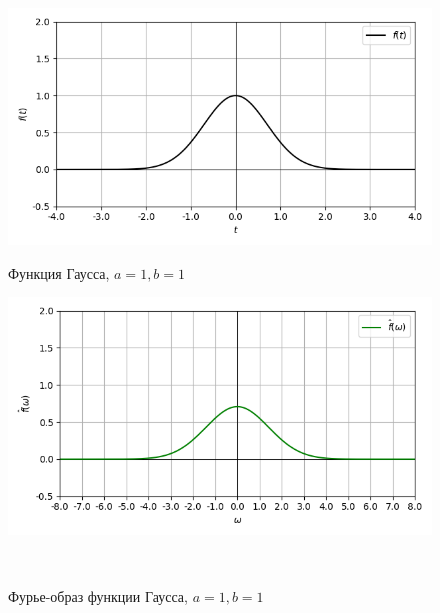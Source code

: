 \documentclass[a4paper]{article}
\begin{document}
\begin{figure}[H]
    \begin{minipage}{0.5\textwidth}
        \centering \includegraphics[width=\textwidth]{gaussian/real_graph_1_1.png}
        \caption{Функция Гаусса, $a = 1, b = 1$}
    \end{minipage}\hfill
    \begin{minipage}{0.5\textwidth}
        \centering \includegraphics[width=\textwidth]{gaussian/real_fourier_1_1.png}
        \caption{Фурье-образ функции Гаусса, $a = 1, b = 1$}
    \end{minipage}\\[1em]
\end{figure}\noindent\
\end{document}
